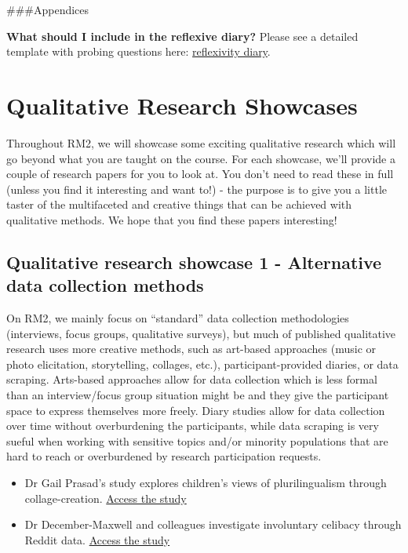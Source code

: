 \documentclass[
  english,
  letterpaper,
  DIV=11,
  numbers=noendperiod]{scrreprt}
\providecommand{\tightlist}{%
  \setlength{\itemsep}{0pt}\setlength{\parskip}{0pt}}
\begin{document}
\#\#\#Appendices

\textbf{What should I include in the reflexive diary?} Please see a
detailed template with probing questions here:
\href{https://gla-my.sharepoint.com/:w:/g/personal/ashley_robertson_glasgow_ac_uk/IQC1PIxhBlndR74S_nfeKHNlAW5uQmGOpoRXCpLHC2fI_fI?e=aunShJ}{reflexivity
diary}.

\cleardoublepage
{}
{}
\appendix

\chapter{Qualitative Research Showcases}\label{appendix_a_showcase}

Throughout RM2, we will showcase some exciting qualitative research
which will go beyond what you are taught on the course. For each
showcase, we'll provide a couple of research papers for you to look at.
You don't need to read these in full (unless you find it interesting and
want to!) - the purpose is to give you a little taster of the
multifaceted and creative things that can be achieved with qualitative
methods. We hope that you find these papers interesting!

\section{Qualitative research showcase 1 - Alternative data collection
methods}\label{qualitative-research-showcase-1---alternative-data-collection-methods}

On RM2, we mainly focus on ``standard'' data collection methodologies
(interviews, focus groups, qualitative surveys), but much of published
qualitative research uses more creative methods, such as art-based
approaches (music or photo elicitation, storytelling, collages, etc.),
participant-provided diaries, or data scraping. Arts-based approaches
allow for data collection which is less formal than an interview/focus
group situation might be and they give the participant space to express
themselves more freely. Diary studies allow for data collection over
time without overburdening the participants, while data scraping is very
sueful when working with sensitive topics and/or minority populations
that are hard to reach or overburdened by research participation
requests.

\begin{itemize}
\tightlist
\item
  Dr Gail Prasad's study explores children's views of plurilingualism
  through collage-creation.
  \href{https://www.tandfonline.com/doi/full/10.1080/13670050.2017.1420033}{Access
  the study}
\item
  Dr December-Maxwell and colleagues investigate involuntary celibacy
  through Reddit data.
  \href{https://link.springer.com/article/10.1007/s12119-020-09724-6}{Access
  the study}
\end{itemize}
\end{document}
